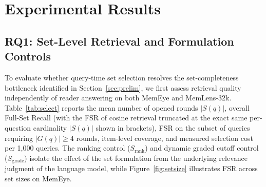 \documentclass[10pt]{article}
\begin{document}
\section{Experimental Results}
\label{sec:results}

\subsection{RQ1: Set-Level Retrieval and Formulation Controls}
\label{sec:rq1}

To evaluate whether query-time set selection resolves the set-completeness bottleneck identified in Section~\ref{sec:prelim}, we first assess retrieval quality independently of reader answering on both MemEye and MemLens-32k. Table~\ref{tab:select} reports the mean number of opened rounds $|S(q)|$, overall Full-Set Recall (with the FSR of cosine retrieval truncated at the exact same per-question cardinality $|S(q)|$ shown in brackets), FSR on the subset of queries requiring $|G(q)| \ge 4$ rounds, item-level coverage, and measured selection cost per 1,000 queries. The ranking control ($S_{\mathrm{rank}}$) and dynamic graded cutoff control ($S_{\mathrm{grade}}$) isolate the effect of the set formulation from the underlying relevance judgment of the language model, while Figure~\ref{fig:setsize} illustrates FSR across set sizes on MemEye.
\end{document}
